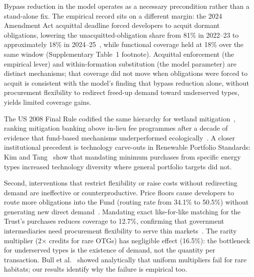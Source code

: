 \documentclass[pdflatex,sn-nature,oneside]{sn-jnl}
\begin{document}
Bypass reduction in the model operates as a necessary precondition rather
than a stand-alone fix. The empirical record sits on a different margin:
the 2024 Amendment Act acquittal deadline forced developers to acquit dormant
obligations, lowering the unacquitted-obligation share from 81\% in
2022--23 to approximately 18\% in 2024--25~\cite{IPART2025}, while
functional coverage held at 18\% over the same window (Supplementary
Table~1 footnote). Acquittal enforcement (the empirical lever) and
within-formation substitution (the model parameter) are distinct
mechanisms; that coverage did not move when obligations were forced to
acquit is consistent with the model's finding that bypass reduction alone,
without procurement flexibility to redirect freed-up demand toward
underserved types, yields limited coverage gains.

The US 2008 Final Rule codified the same hierarchy for wetland
mitigation~\cite{USFinalRule2008}, ranking mitigation banking above
in-lieu fee programmes after a decade of evidence that fund-based
mechanisms underperformed ecologically~\cite{HoughHarrington2019}.
A closer institutional precedent is technology carve-outs in
Renewable Portfolio Standards: Kim and Tang~\cite{KimTang2020} show
that mandating minimum purchases from specific energy types
increased technology diversity where general portfolio targets did
not.

Second, interventions that restrict flexibility or raise costs without
redirecting demand are ineffective or counterproductive.
Price floors cause developers to route more obligations into the Fund
(routing rate from 34.1\% to 50.5\%) without generating new direct
demand~\cite{WoodJotzo2011}.
Mandating exact like-for-like matching for the Trust's purchases reduces
coverage to 12.7\%, confirming that government intermediaries need procurement
flexibility to serve thin markets~\cite{VanTeeffelen2014}.
The rarity multiplier (2$\times$ credits for rare OTGs) has negligible
effect (16.5\%): the bottleneck for underserved types is the
existence of demand, not the quantity per transaction. Bull et
al.~\cite{Bull2017multipliers} showed analytically that uniform
multipliers fail for rare habitats; our results identify why the
failure is empirical too.
\end{document}
